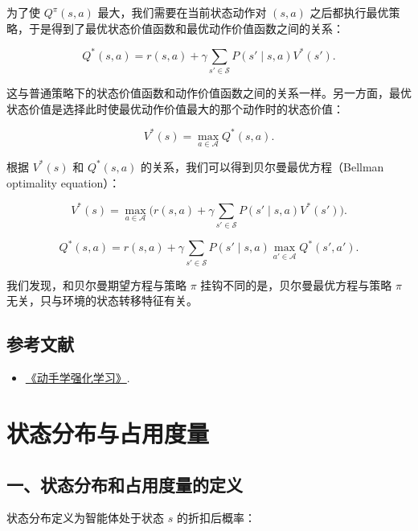 为了使 \(Q^{\pi}(s,a)\) 最大，我们需要在当前状态动作对 \((s,a)\) 之后都执行最优策略，于是得到了最优状态价值函数和最优动作价值函数之间的关系：

\[
Q^{*}(s,a)=r(s,a)+\gamma\sum_{s'\in\mathcal{S}}P(s'\mid s,a)V^{*}(s').
\]

这与普通策略下的状态价值函数和动作价值函数之间的关系一样。另一方面，最优状态价值是选择此时使最优动作价值最大的那个动作时的状态价值：

\[
V^{*}(s)=\max_{a\in\mathcal{A}}Q^{*}(s,a).
\]

根据 \(V^{*}(s)\) 和 \(Q^{*}(s,a)\) 的关系，我们可以得到贝尔曼最优方程（Bellman optimality equation）：

\[
V^{*}(s)=\max_{a\in\mathcal{A}}\bigl(r(s,a)+\gamma\sum_{s'\in\mathcal{S}}P(s'\mid s,a)V^{*}(s')\bigr).
\]

\[
Q^{*}(s,a)=r(s,a)+\gamma\sum_{s'\in\mathcal{S}}P(s'\mid s,a)
\max_{a'\in\mathcal{A}}Q^{*}(s',a').
\]

我们发现，和贝尔曼期望方程与策略 \(\pi\) 挂钩不同的是，贝尔曼最优方程与策略 \(\pi\) 无关，只与环境的状态转移特征有关。

\hypertarget{ux53c2ux8003ux6587ux732e-41}{%
\subsection{参考文献}\label{ux53c2ux8003ux6587ux732e-41}}

\begin{itemize}
\tightlist
\item
  \href{https://hrl.boyuai.com/}{《动手学强化学习》}.
\end{itemize}

\clearpage

\hypertarget{ux72b6ux6001ux5206ux5e03ux4e0eux5360ux7528ux5ea6ux91cf}{%
\section{状态分布与占用度量}\label{ux72b6ux6001ux5206ux5e03ux4e0eux5360ux7528ux5ea6ux91cf}}

\hypertarget{ux4e00ux72b6ux6001ux5206ux5e03ux548cux5360ux7528ux5ea6ux91cfux7684ux5b9aux4e49}{%
\subsection{一、状态分布和占用度量的定义}\label{ux4e00ux72b6ux6001ux5206ux5e03ux548cux5360ux7528ux5ea6ux91cfux7684ux5b9aux4e49}}

状态分布定义为智能体处于状态 \(s\) 的折扣后概率：

